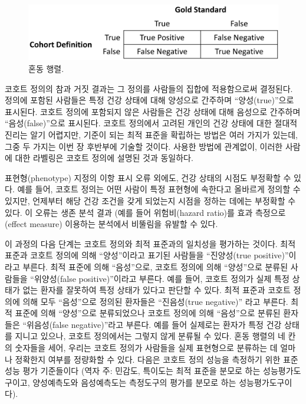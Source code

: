 \documentclass[10.5pt]{book}
\theoremstyle{definition}
\theoremstyle{definition}
\theoremstyle{definition}
\theoremstyle{remark}
\begin{document}
\begin{figure}

{\centering \includegraphics[width=0.75\linewidth]{images/ClinicalValidity/matrix} 

}

\caption{혼동 행렬.}\label{fig:matrix}
\end{figure}

코호트 정의의 참과 거짓 결과는 그 정의를 사람들의 집합에 적용함으로써
결정된다. 정의에 포함된 사람들은 특정 건강 상태에 대해 양성으로 간주하며
``양성(true)''으로 표시된다. 코호트 정의에 포함되지 않은 사람들은 건강
상태에 대해 음성으로 간주하며 ``음성(false)''으로 표시된다. 코호트
정의에서 고려된 개인의 건강 상태에 대한 절대적 진리는 알기 어렵지만,
기준이 되는 최적 표준을 확립하는 방법은 여러 가지가 있는데, 그중 두
가지는 이번 장 후반부에 기술할 것이다. 사용한 방법에 관계없이, 이러한
사람에 대한 라벨링은 코호트 정의에 설명된 것과 동일하다.

표현형(phenotype) 지정의 이항 표시 오류 외에도, 건강 상태의 시점도
부정확할 수 있다. 예를 들어, 코호트 정의는 어떤 사람이 특정 표현형에
속한다고 올바르게 정의할 수 있지만, 언제부터 해당 건강 조건을 갖게
되었는지 시점을 정하는 데에는 부정확할 수 있다. 이 오류는 생존 분석 결과
(예를 들어 위험비(hazard ratio)를 효과 측정으로(effect measure) 이용하는
분석에서 비뚤림을 유발할 수 있다.

이 과정의 다음 단계는 코호트 정의와 최적 표준과의 일치성을 평가하는
것이다. 최적 표준과 코호트 정의에 의해 ``양성''이라고 표기된 사람들을
``진양성(true positive)''이라고 부른다. 최적 표준에 의해 ``음성''으로,
코호트 정의에 의해 ``양성''으로 분류된 사람들을 ``위양성(false
positive)''이라고 부른다. 예를 들어, 코호트 정의가 실제 특정 상태가 없는
환자를 잘못하여 특정 상태가 있다고 판단할 수 있다. 최적 표준과 코호트
정의에 의해 모두 ``음성''으로 정의된 환자들은 ``진음성(true negative)''
라고 부른다. 최적 표준에 의해 ``양성''으로 분류되었으나 코호트 정의에
의해 ``음성''으로 분류된 환자들은 ``위음성(false negative)''라고 부른다.
예를 들어 실제로는 환자가 특정 건강 상태를 지니고 있으나, 코호트
정의에서는 그렇지 않게 분류될 수 있다. 혼동 행렬의 네 칸의 숫자들을
세어, 우리는 코호트 정의가 사람들을 실제 표현형으로 분류하는 데 얼마나
정확한지 여부를 정량화할 수 있다. 다음은 코호트 정의 성능을 측정하기
위한 표준 성능 평가 기준들이다 (역자 주: 민감도, 특이도는 최적 표준을
분모로 하는 성능평가도구이고, 양성예측도와 음성예측도는 측정도구의
평가를 분모로 하는 성능평가도구이다).
\end{document}
